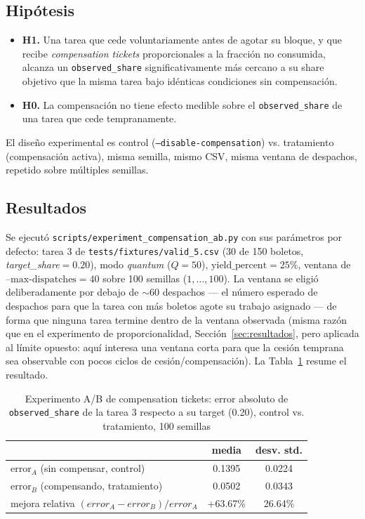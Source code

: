 \subsection{Hipótesis}

\begin{itemize}
\item \textbf{H1.} Una tarea que cede voluntariamente antes de agotar su
  bloque, y que recibe \textit{compensation tickets} proporcionales a la
  fracción no consumida, alcanza un \texttt{observed\_share} significativamente
  más cercano a su share objetivo que la misma tarea bajo idénticas
  condiciones sin compensación.
\item \textbf{H0.} La compensación no tiene efecto medible sobre el
  \texttt{observed\_share} de una tarea que cede tempranamente.
\end{itemize}

El diseño experimental es control (\texttt{--disable-compensation}) vs.
tratamiento (compensación activa), misma semilla, mismo CSV, misma ventana
de despachos, repetido sobre múltiples semillas.

\subsection{Resultados}
\label{sec:resultados-extension}

Se ejecutó \texttt{scripts/experiment\_compensation\_ab.py} con sus
parámetros por defecto: tarea 3 de \texttt{tests/fixtures/valid\_5.csv} (30
de 150 boletos, \textit{target\_share}$=0.20$), modo \textit{quantum}
($Q=50$), $\text{yield\_percent}=25\%$, ventana de
$\text{--max-dispatches}=40$ sobre 100 semillas ($1,\ldots,100$). La
ventana se eligió deliberadamente por debajo de $\sim 60$ despachos --- el
número esperado de despachos para que la tarea con más boletos agote su
trabajo asignado --- de forma que ninguna tarea termine dentro de la
ventana observada (misma razón que en el experimento de proporcionalidad,
Sección~\ref{sec:resultados}, pero aplicada al límite opuesto: aquí
interesa una ventana corta para que la cesión temprana sea observable con
pocos ciclos de cesión/compensación). La Tabla~\ref{tab:extension-ab}
resume el resultado.

\begin{table}[htbp]
\caption{Experimento A/B de compensation tickets: error absoluto de
\texttt{observed\_share} de la tarea 3 respecto a su target (0.20), control
vs. tratamiento, 100 semillas}
\label{tab:extension-ab}
\centering
\begin{tabular}{lcc}
\toprule
 & media & desv. std. \\
\midrule
error$_A$ (sin compensar, control) & 0.1395 & 0.0224 \\
error$_B$ (compensando, tratamiento) & 0.0502 & 0.0343 \\
mejora relativa $(error_A - error_B)/error_A$ & +63.67\% & 26.64\% \\
\bottomrule
\end{tabular}
\end{table}

